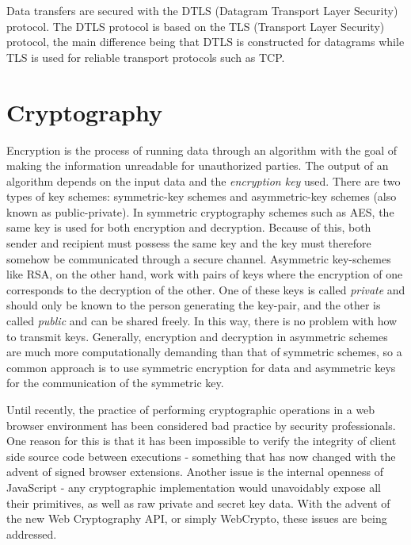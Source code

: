 Data transfers are secured with the DTLS (Datagram Transport Layer Security) protocol. The DTLS protocol is based on the TLS (Transport Layer Security) protocol, the main difference being that DTLS is constructed for datagrams while TLS is used for reliable transport protocols such as TCP.

\section{Cryptography}
Encryption is the process of running data through an algorithm with the goal of making the information unreadable for unauthorized parties. The output of an algorithm depends on the input data and the \emph{encryption key} used. There are two types of key schemes: symmetric-key schemes and asymmetric-key schemes (also known as public-private). In symmetric cryptography  schemes such as AES, the same key is used for both encryption and decryption. Because of this, both sender and recipient must possess the same key and the key must therefore somehow be communicated through a secure channel. Asymmetric key-schemes like RSA, on the other hand, work with pairs of keys where the encryption of one corresponds to the decryption of the other. One of these keys is called \emph{private} and should only be known to the person generating the key-pair, and the other is called \emph{public} and can be shared freely. In this way, there is no problem with how to transmit keys. Generally, encryption and decryption in asymmetric schemes are much more computationally demanding than that of symmetric schemes, so a common approach is to use symmetric encryption for data and asymmetric keys for the communication of the symmetric key.

Until recently, the practice of performing cryptographic operations in a web browser environment has been considered bad practice by security professionals\cite{Matasano:Online}. One reason for this is that it has been impossible to verify the integrity of client side source code between executions - something that has now changed with the advent of signed browser extensions. Another issue is the internal openness of JavaScript - any cryptographic implementation would unavoidably expose all their primitives, as well as raw private and secret key data. With the advent of the new Web Cryptography API, or simply WebCrypto, these issues are being addressed\cite{WebCrypto:Online}.

